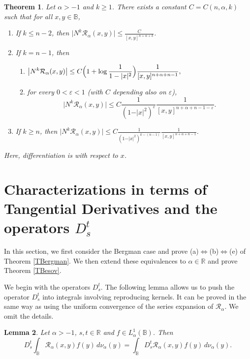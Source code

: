 \documentclass{amsart}
\newtheorem{theorem}{Theorem}[section]
\newtheorem{lemma}[theorem]{Lemma}
\theoremstyle{definition}
\theoremstyle{remark}
\begin{document}
\begin{theorem}\label{TNormalKernel}
Let $\alpha>-1$ and $k\ge 1$.
There exists a constant $C=C(n,\alpha,k)$ such that for all
$x,y\in\mathbb B$,
\begin{enumerate}
\item[(i)] If $k\le n-2$, then
$\displaystyle \vert N^k \mathcal R_\alpha(x,y)\vert
\le \frac{C}{[x,y]^{n+\alpha+k}}$.
\item[(ii)] If $k=n-1$, then
\begin{enumerate}
\item[(a)]
$\displaystyle
\bigl\vert N^k \mathcal R_\alpha(x,y)\bigr\vert
\le C\Bigl(1+\log\frac{1}{1-\vert x\vert^2}\Bigr)
\frac{1}{[x,y]^{n+\alpha+n-1}},$
\item[(b)]
for every $0<\varepsilon<1$ (with $C$ depending also on $\varepsilon$),
\begin{equation*}
\bigl\vert N^k \mathcal R_\alpha(x,y)\bigr\vert
\le C\frac{1}{(1-\vert x\vert^2)^{\varepsilon}}
\frac{1}{[x,y]^{n+\alpha+n-1-\varepsilon}}.
\end{equation*}
\end{enumerate}
\item[(iii)] If $k\ge n$, then
$\displaystyle \bigl\vert N^k \mathcal R_\alpha(x,y)\bigr\vert
\le C\frac{1}{(1-\vert x\vert^2)^{k-(n-1)}}
\frac{1}{[x,y]^{n+\alpha+n-1}}$.
\end{enumerate}
Here, differentiation is with respect to $x$.
\end{theorem}

%
\section{Characterizations in terms of Tangential Derivatives and the operators $D^t_s$}
%

In this section, we first consider the Bergman case and prove
(a)$\Leftrightarrow$(b)$\Leftrightarrow$(e) of Theorem \ref{TBergman}.
We then extend these equivalences to $\alpha\in\mathbb R$ and prove
Theorem \ref{TBesov}.

We begin with the operators $D^t_s$.
The following lemma allows us to push the operator $D^t_s$ into integrals
involving reproducing kernels.
It can be proved in the same way as \cite[Lemma 3.3]{U3} using the
uniform convergence of the series expansion of $\mathcal R_\alpha$.
We omit the details.

\begin{lemma}\label{LPushDst}
Let $\alpha>-1$, $s,t\in\mathbb R$ and $f\in L^1_\alpha(\mathbb B)$.
Then
\begin{equation*}
D^t_s \int_{\mathbb B}\mathcal R_\alpha(x,y)f(y)\,d\nu_\alpha(y)
=\int_{\mathbb B}D^t_s \mathcal R_\alpha(x,y)f(y)\,d\nu_\alpha(y).
\end{equation*}
\end{lemma}
\end{document}

